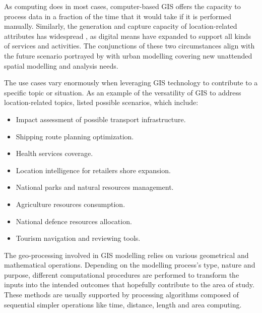 \documentclass[12pt, a4paper]{report}
\begin{document}





As computing does in most cases, computer-based GIS offers the capacity to process data in a fraction of the time that it would take if it is performed manually. Similarly, the generation and capture capacity of location-related attributes has widespread \citep{longleyGeographicInformationScience2015}, as digital means have expanded to support all kinds of services and activities. The conjunctions of these two circumstances align with the future scenario portrayed by \cite{wilsonFutureUrbanModelling2018} with urban modelling covering new unattended spatial modelling and analysis needs.

The use cases vary enormously when leveraging GIS technology to contribute to a specific topic or situation. As an example of the versatility of GIS to address location-related topics, \citep{longleyGeographicInformationScience2015} listed possible scenarios, which include:

\begin{itemize}
\item Impact assessment of possible transport infrastructure.
\item Shipping route planning optimization.
\item Health services coverage.
\item Location intelligence for retailers shore expansion.
\item National parks and natural resources management.
\item Agriculture resources consumption.
\item National defence resources allocation.
\item Tourism navigation and reviewing tools.
\end{itemize}

The geo-processing involved in GIS modelling relies on various geometrical and mathematical operations. Depending on the modelling process's type, nature and purpose, different computational procedures are performed to transform the inputs into the intended outcomes that hopefully contribute to the area of study. These methods are usually supported by processing algorithms composed of sequential simpler operations like time, distance, length and area computing. 
\end{document}
